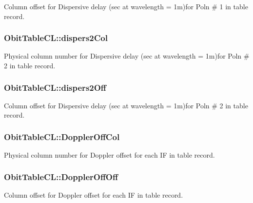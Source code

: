 Column offset for Dispersive delay (sec at wavelength = 1m)for Poln \# 1 in table record. 

\subsubsection{ {\bf Obit\-Table\-CL::dispers2Col}}\label{structObitTableCL_o72}


Physical column number for Dispersive delay (sec at wavelength = 1m)for Poln \# 2 in table record. 

\subsubsection{ {\bf Obit\-Table\-CL::dispers2Off}}\label{structObitTableCL_o71}


Column offset for Dispersive delay (sec at wavelength = 1m)for Poln \# 2 in table record. 

\subsubsection{ {\bf Obit\-Table\-CL::Doppler\-Off\-Col}}\label{structObitTableCL_o42}


Physical column number for Doppler offset for each IF in table record. 

\subsubsection{ {\bf Obit\-Table\-CL::Doppler\-Off\-Off}}\label{structObitTableCL_o41}


Column offset for Doppler offset for each IF in table record. 

